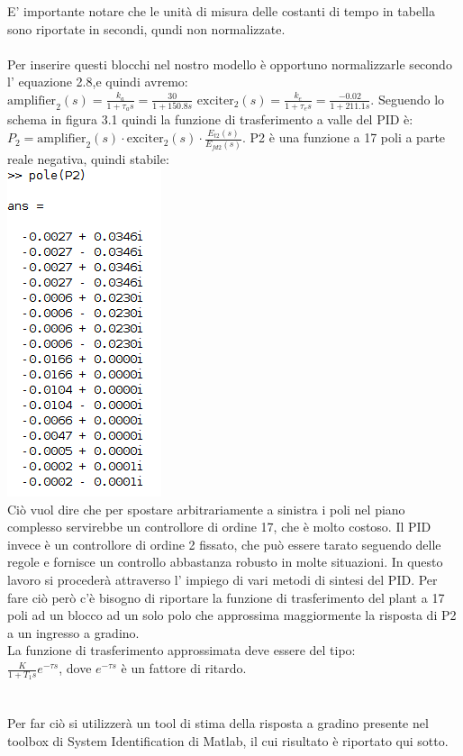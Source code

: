 \documentclass[Lau,noexaminfo]{sapthesis}
\begin{document}
 	E' importante notare che le unità di misura delle costanti di tempo in tabella sono riportate in secondi, qundi non normalizzate. \\\\Per inserire questi blocchi nel nostro modello è opportuno normalizzarle secondo l' equazione 2.8,e quindi avremo:\\ $\text{amplifier}_2(s)=\frac{k_a}{1+\tau_as}=\frac{30}{1+150.8s}$ \qquad $\text{exciter}_2(s)=\frac{k_e}{1+\tau_es}=\frac{-0.02}{1+211.1s}$.
 	Seguendo lo schema in figura 3.1 quindi la funzione di trasferimento a valle del PID è:\\
 	$P_2=\text{amplifier}_2(s)\cdot\text{exciter}_2(s)\cdot\frac{E_{t2}(s)}{E_{fd2}(s)}$. P2 è una funzione a 17 poli a parte reale negativa, quindi stabile:\\
 	\includegraphics[height=0.26\textheight]{poli_p2}\\
 	Ciò vuol dire che per spostare arbitrariamente a sinistra i poli nel piano complesso servirebbe un controllore di ordine 17, che è molto costoso. Il PID invece è un controllore di ordine 2 fissato, che può essere tarato seguendo delle regole e fornisce un controllo abbastanza robusto in molte situazioni. In questo lavoro si procederà attraverso l' impiego di vari metodi di sintesi del PID. Per fare ciò però c'è bisogno di riportare la funzione di trasferimento del plant a 17 poli ad un blocco ad un solo polo che approssima maggiormente la risposta di P2 a un ingresso a gradino.\\
 	La funzione di trasferimento approssimata deve essere del tipo:\\
 	$\frac{K}{1+T_1 s} e^{-\tau s}$, dove $e^{-\tau s}$ è un fattore di ritardo.\\\\\\Per far ciò si utilizzerà un tool di stima della risposta a gradino presente nel toolbox di System Identification di Matlab, il cui risultato è riportato qui sotto.\\
\end{document}
